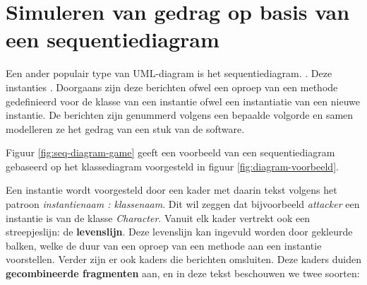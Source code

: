 \chapter{Simuleren van gedrag op basis van een sequentiediagram}\label{sec:gedrag}
Een ander populair type van UML-diagram is het sequentiediagram. \DIFdelbegin {}\DIFdelend \DIFaddbegin {}\DIFaddend . Deze instanties \DIFdelbegin {}\DIFdelend \DIFaddbegin {}\DIFaddend . Doorgaans zijn deze berichten ofwel een oproep van een methode gedefinieerd voor de klasse van een instantie ofwel een instantiatie van een nieuwe instantie. De berichten zijn genummerd volgens een bepaalde volgorde en samen modelleren ze het gedrag van een stuk van de software.

\parbreak

Figuur \ref{fig:seq-diagram-game} geeft een voorbeeld van een sequentiediagram gebaseerd op het klassediagram voorgesteld in figuur \ref{fig:diagram-voorbeeld}.

\DIFdelbegin %
{%
}

\DIFdelend Een instantie wordt voorgesteld door een kader met daarin tekst volgens het patroon \textit{instantienaam : klassenaam}. Dit wil zeggen dat bijvoorbeeld \textit{attacker} een instantie is van de klasse \textit{Character}. Vanuit elk kader vertrekt ook een streepjeslijn: de \textbf{levenslijn}. Deze levenslijn kan ingevuld worden door gekleurde balken, welke de duur van een oproep van een methode aan een instantie voorstellen.
Verder zijn er ook kaders die berichten omsluiten. Deze kaders duiden \textbf{gecombineerde fragmenten} aan, en in deze tekst beschouwen we twee soorten:

